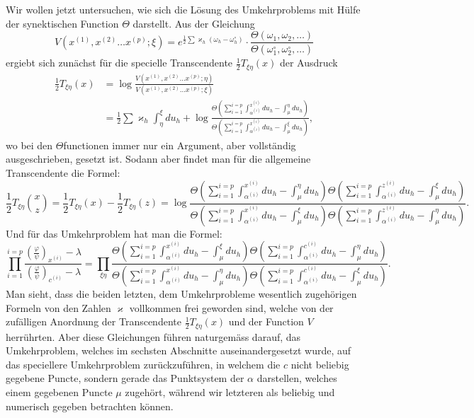 \documentclass[10pt]{article}
\begin{document}
Wir wollen jetzt untersuchen, wie sich die Lösung des Umkehrproblems mit Hülfe der synektischen Function \(\Theta\) darstellt. Aus der Gleichung
\[
V(x^{(1)},x^{(2)}\ldots x^{(p)};\xi)
=e^{\frac12\sum\varkappa_h(\omega_h-\omega_h^\circ)}
\cdot\frac{\Theta(\omega_1,\omega_2,\ldots)}
{\Theta(\omega_1^\circ,\omega_2^\circ,\ldots)}
\]
ergiebt sich zunächst für die specielle Transcendente \(\frac12T_{\xi\eta}(x)\) der Ausdruck
\[
\begin{aligned}
\frac12T_{\xi\eta}(x)
&=\log\frac{V(x^{(1)},x^{(2)}\ldots x^{(p)};\eta)}
{V(x^{(1)},x^{(2)}\ldots x^{(p)};\xi)}\\
&=\frac12\sum\varkappa_h\int_{\eta}^{\xi}du_h
+\log\frac{\Theta\!\left(\sum_{i=1}^{i=p}\int_{\alpha^{(i)}}^{x^{(i)}}du_h-\int_{\mu}^{\eta}du_h\right)}
{\Theta\!\left(\sum_{i=1}^{i=p}\int_{\alpha^{(i)}}^{x^{(i)}}du_h-\int_{\mu}^{\xi}du_h\right)},
\end{aligned}
\]
wo bei den \(\Theta\)functionen immer nur ein Argument, aber vollständig ausgeschrieben, gesetzt ist. Sodann aber findet man für die allgemeine Transcendente die Formel:
\[
\tag{1}
\frac12T_{\xi\eta}\binom{x}{z}
=\frac12T_{\xi\eta}(x)-\frac12T_{\xi\eta}(z)
=\log\frac{
\Theta\!\left(\sum_{i=1}^{i=p}\int_{\alpha^{(i)}}^{x^{(i)}}du_h-\int_{\mu}^{\eta}du_h\right)
\Theta\!\left(\sum_{i=1}^{i=p}\int_{\alpha^{(i)}}^{z^{(i)}}du_h-\int_{\mu}^{\xi}du_h\right)}
{\Theta\!\left(\sum_{i=1}^{i=p}\int_{\alpha^{(i)}}^{x^{(i)}}du_h-\int_{\mu}^{\xi}du_h\right)
\Theta\!\left(\sum_{i=1}^{i=p}\int_{\alpha^{(i)}}^{z^{(i)}}du_h-\int_{\mu}^{\eta}du_h\right)}.
\]
Und für das Umkehrproblem hat man die Formel:
\[
\tag{2}
\prod_{i=1}^{i=p}
\frac{\left(\frac{\varphi}{\psi}\right)_{x^{(i)}}-\lambda}
{\left(\frac{\varphi}{\psi}\right)_{c^{(i)}}-\lambda}
=
\prod_{\xi\eta}
\frac{
\Theta\!\left(\sum_{i=1}^{i=p}\int_{\alpha^{(i)}}^{x^{(i)}}du_h-\int_{\mu}^{\xi}du_h\right)
\Theta\!\left(\sum_{i=1}^{i=p}\int_{\alpha^{(i)}}^{c^{(i)}}du_h-\int_{\mu}^{\eta}du_h\right)}
{\Theta\!\left(\sum_{i=1}^{i=p}\int_{\alpha^{(i)}}^{x^{(i)}}du_h-\int_{\mu}^{\eta}du_h\right)
\Theta\!\left(\sum_{i=1}^{i=p}\int_{\alpha^{(i)}}^{c^{(i)}}du_h-\int_{\mu}^{\xi}du_h\right)}.
\]
Man sieht, dass die beiden letzten, dem Umkehrprobleme wesentlich zugehörigen Formeln von den Zahlen \(\varkappa\) vollkommen frei geworden sind, welche von der zufälligen Anordnung der Transcendente \(\frac12T_{\xi\eta}(x)\) und der Function \(V\) herrührten. Aber diese Gleichungen führen naturgemäss darauf, das Umkehrproblem, welches im sechsten Abschnitte auseinandergesetzt wurde, auf das speciellere Umkehrproblem zurückzuführen, in welchem die \(c\) nicht beliebig gegebene Puncte, sondern gerade das Punktsystem der \(\alpha\) darstellen, welches einem gegebenen Puncte \(\mu\) zugehört, während wir letzteren als beliebig und numerisch gegeben betrachten können.
\end{document}
